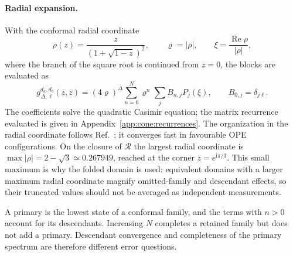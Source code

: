 \documentclass[11pt,a4paper]{article}
\numberwithin{equation}{section}
\begin{document}
\paragraph{Radial expansion.} With the conformal radial coordinate
\begin{equation}
 \rho(z)=\frac{z}{(1+\sqrt{1-z})^2},\qquad \varrho=|\rho|,\qquad \xi=\frac{\operatorname{Re}\rho}{|\rho|},
\end{equation}
where the branch of the square root is continued from $z=0$, the blocks are evaluated as
\begin{equation}
 g_{\Delta,\ell}^{d_a,d_b}(z,\bar z)=(4\varrho)^\Delta\sum_{n=0}^{N}\varrho^n\sum_jB_{n,j}P_j(\xi),\qquad
 B_{0,j}=\delta_{j\ell}.
 \label{eq:cone:rhoblock}
\end{equation}
The coefficients solve the quadratic Casimir equation; the matrix recurrence evaluated is given in
Appendix~\ref{app:cone:recurrences}. The organization in the radial coordinate follows Ref.~\cite{Hogervorst:2013}; it
converges fast in favourable OPE configurations. On the closure of $\mathcal R$ the largest radial coordinate is
$\max|\rho|=2-\sqrt3\simeq0.267949$, reached at the corner $z=e^{\mathrm i\pi/3}$. This small maximum is why the folded domain
is used: equivalent domains with a larger maximum radial coordinate magnify omitted-family and descendant effects, so
their truncated values should not be averaged as independent measurements.

A primary is the lowest state of a conformal family, and the terms with $n>0$ account for its descendants. Increasing
$N$ completes a retained family but does not add a primary. Descendant convergence and completeness of the primary
spectrum are therefore different error questions.
\end{document}
